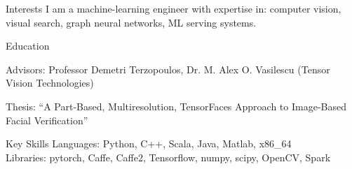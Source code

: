 \documentclass{resume}
\begin{document}
\maketitle
\thispagestyle{empty} %

\vspace{-0.5em}

\begin{component}{Interests}
I am a machine-learning engineer with expertise in: computer vision, visual search, graph neural networks, ML serving systems.
\end{component}

\vspace{-0.5em}

\begin{component}{Education}

    \hspace{1em} Advisors: Professor Demetri Terzopoulos, Dr. M. Alex O. Vasilescu (Tensor Vision Technologies)

    \hspace{1em} Thesis: ``{A Part-Based, Multiresolution, TensorFaces Approach to Image-Based Facial Verification}''
    
\end{component}

\vspace{-0.25em}

\begin{component}{Key Skills}
		Languages: Python, C++, Scala, Java, Matlab, x86\_64\\
		Libraries: pytorch, Caffe, Caffe2, Tensorflow, numpy, scipy, OpenCV, Spark \\
\end{component}

\vspace{-1.5em}
\end{document}
